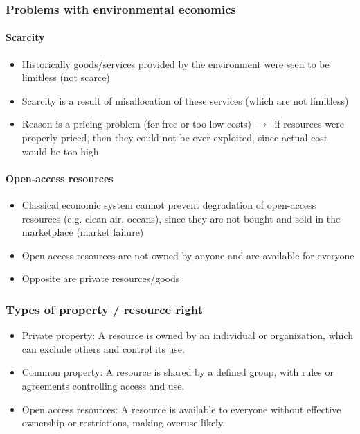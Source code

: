 \documentclass{article}
\begin{document}
\subsubsection{Problems with environmental economics}
\paragraph{Scarcity}
\begin{itemize}
    \item Historically goods/services provided by the environment were seen to be limitless (not scarce)
    \item Scarcity is a result of misallocation of these services (which are not limitless)
    \item Reason is a pricing problem (for free or too low costs) $\to$\ if resources were properly priced, then they could not be over-exploited, since actual cost would be too high
\end{itemize}

\paragraph{Open-access resources}
\begin{itemize}
    \item Classical economic system cannot prevent degradation of open-access resources (e.g. clean air, oceans), since they are not bought and sold in the marketplace (market failure)
    \item Open-access resources are not owned by anyone and are available for everyone
    \item Opposite are private resources/goods
\end{itemize}

\subsubsection{Types of property / resource right}
\begin{itemize}
    \item Private property: A resource is owned by an individual or organization, which can exclude others and control its use.
    \item Common property: A resource is shared by a defined group, with rules or agreements controlling access and use.
    \item Open access resources: A resource is available to everyone without effective ownership or restrictions, making overuse likely.
\end{itemize}
\end{document}
